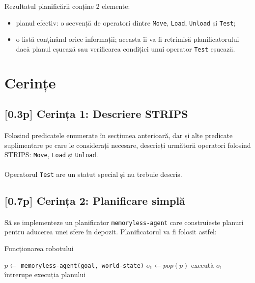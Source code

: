 \documentclass[12pt]{article}
\newcommand{\repr}[1]{{\color{sapphire}\texttt{#1}}}
\begin{document}
Rezultatul planificării conține 2 elemente:
\begin{itemize}
\item planul efectiv: o secvență de operatori dintre \repr{Move},
  \repr{Load}, \repr{Unload} și \repr{Test};
\item o listă conținând orice informații; aceasta îi va fi retrimisă
  planificatorului dacă planul eșuează sau verificarea condiției unui
  operator \repr{Test} eșuează.
\end{itemize}


\section{Cerințe}
\label{sec:tasks}

\subsection{[0.3p] Cerința 1: Descriere STRIPS}

\paragraph{}

Folosind predicatele enumerate în secțiunea anterioară, dar și alte
predicate suplimentare pe care le considerați necesare, descrieți
următorii operatori folosind STRIPS: \repr{Move}, \repr{Load} și
\repr{Unload}.

\paragraph{}

Operatorul \repr{Test} are un statut special și nu trebuie descris.

\subsection{[0.7p] Cerința 2: Planificare simplă}

\paragraph{}

Să se implementeze un planificator \repr{memoryless-agent} care
construiește planuri pentru aducerea unei sfere în
depozit. Planificatorul va fi folosit astfel:

\begin{algorithm}[H]
  \caption{Funcționarea robotului}\label{alg:robot}
  \begin{algorithmic}[1]
    \State $p \leftarrow$ \repr{memoryless-agent(goal, world-state)}
    \State $o_1 \leftarrow pop(p)$
    \State execută $o_1$
    \Else
    \State întrerupe execuția planului
    \EndIf
    \EndWhile
    \EndWhile
  \end{algorithmic}
\end{algorithm}
\end{document}

